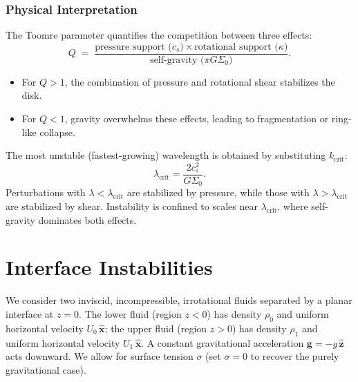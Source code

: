 \subsubsection*{Physical Interpretation}

The Toomre parameter quantifies the competition between three effects:
\[
Q \;=\; 
\frac{\text{pressure support (}c_s\text{)} \times \text{rotational support (}\kappa\text{)}}
{\text{self-gravity (}\pi G \Sigma_0\text{)}}.
\]
\begin{itemize}
    \item For $Q > 1$, the combination of pressure and rotational shear stabilizes the disk.
    \item For $Q < 1$, gravity overwhelms these effects, leading to fragmentation or ring-like collapse.
\end{itemize}

The most unstable (fastest-growing) wavelength is obtained by substituting $k_{\text{crit}}$:
\begin{equation}
\lambda_{\text{crit}} = \frac{2 c_s^2}{G \Sigma_0}.
\end{equation}
Perturbations with $\lambda < \lambda_{\text{crit}}$ are stabilized by pressure,  
while those with $\lambda > \lambda_{\text{crit}}$ are stabilized by shear.  
Instability is confined to scales near $\lambda_{\text{crit}}$, where self-gravity dominates both effects.

\section{Interface Instabilities}
\label{sec:interface_instabilities}

We consider two inviscid, incompressible, irrotational fluids separated by a planar interface at $z=0$. The lower fluid (region $z<0$) has density $\rho_0$ and uniform horizontal velocity $U_0\,\hat{\mathbf{x}}$; the upper fluid (region $z>0$) has density $\rho_1$ and uniform horizontal velocity $U_1\,\hat{\mathbf{x}}$. A constant gravitational acceleration $\mathbf{g} = -g\,\hat{\mathbf{z}}$ acts downward. We allow for surface tension $\sigma$ (set $\sigma=0$ to recover the purely gravitational case).

